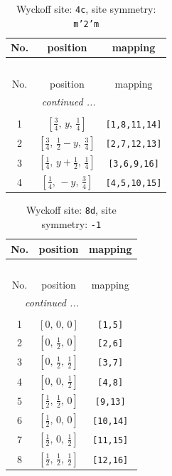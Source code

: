 \documentclass[fleqn,8pt]{jsarticle}
\begin{document}
\renewcommand{\arraystretch}{1.2}
\begin{longtable}{ccc}
\caption{Wyckoff site: {\tt 4c}, site symmetry: {\tt m'2'm}}
 \\
 \hline \hline
No. & position & mapping \\ \hline \endfirsthead

\multicolumn{2}{l}{\tablename\ \thetable{}} \\
 \hline \hline
No. & position & mapping \\ \hline \endhead

 \hline \hline
\multicolumn{2}{r}{\footnotesize\it continued ...} \\ \endfoot

 \hline \hline
\multicolumn{2}{r}{} \\ \endlastfoot

1 & $\left[ \frac{3}{4},\, y,\, \frac{1}{4} \right]$ & {\tt [1,8,11,14]} \\ \hline
2 & $\left[ \frac{3}{4},\, \frac{1}{2} - y,\, \frac{3}{4} \right]$ & {\tt [2,7,12,13]} \\ \hline
3 & $\left[ \frac{1}{4},\, y + \frac{1}{2},\, \frac{1}{4} \right]$ & {\tt [3,6,9,16]} \\ \hline
4 & $\left[ \frac{1}{4},\, - y,\, \frac{3}{4} \right]$ & {\tt [4,5,10,15]} \\
\end{longtable}
\renewcommand{\arraystretch}{1.2}
\begin{longtable}{ccc}
\caption{Wyckoff site: {\tt 8d}, site symmetry: {\tt -1}}
 \\
 \hline \hline
No. & position & mapping \\ \hline \endfirsthead

\multicolumn{2}{l}{\tablename\ \thetable{}} \\
 \hline \hline
No. & position & mapping \\ \hline \endhead

 \hline \hline
\multicolumn{2}{r}{\footnotesize\it continued ...} \\ \endfoot

 \hline \hline
\multicolumn{2}{r}{} \\ \endlastfoot

1 & $\left[ 0,\, 0,\, 0 \right]$ & {\tt [1,5]} \\ \hline
2 & $\left[ 0,\, \frac{1}{2},\, 0 \right]$ & {\tt [2,6]} \\ \hline
3 & $\left[ 0,\, \frac{1}{2},\, \frac{1}{2} \right]$ & {\tt [3,7]} \\ \hline
4 & $\left[ 0,\, 0,\, \frac{1}{2} \right]$ & {\tt [4,8]} \\ \hline
5 & $\left[ \frac{1}{2},\, \frac{1}{2},\, 0 \right]$ & {\tt [9,13]} \\ \hline
6 & $\left[ \frac{1}{2},\, 0,\, 0 \right]$ & {\tt [10,14]} \\ \hline
7 & $\left[ \frac{1}{2},\, 0,\, \frac{1}{2} \right]$ & {\tt [11,15]} \\ \hline
8 & $\left[ \frac{1}{2},\, \frac{1}{2},\, \frac{1}{2} \right]$ & {\tt [12,16]} \\
\end{longtable}
\end{document}
